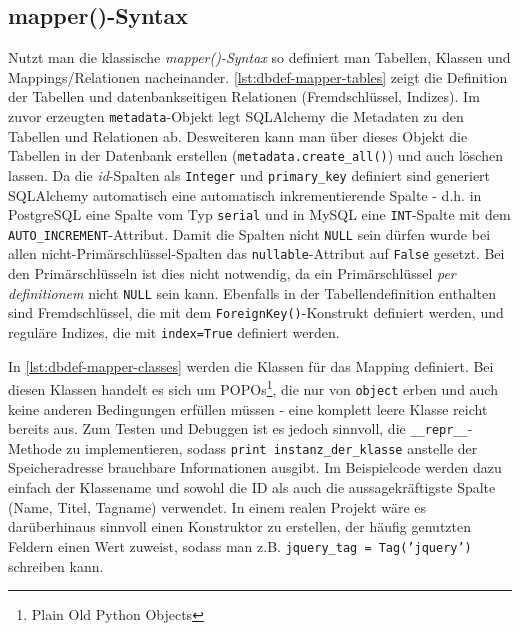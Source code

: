 
\subsection{mapper()-Syntax}

Nutzt man die klassische \emph{mapper()-Syntax} so definiert man Tabellen,
Klassen und Mappings/Relationen nacheinander.
\autoref{lst:dbdef-mapper-tables} zeigt die Definition der Tabellen und
datenbankseitigen Relationen (Fremdschlüssel, Indizes). Im zuvor erzeugten
\texttt{metadata}-Objekt legt SQLAlchemy die Metadaten zu den Tabellen und
Relationen ab. Desweiteren kann man über dieses Objekt die Tabellen in der
Datenbank erstellen (\texttt{metadata.create\_all()}) und auch löschen lassen.
Da die \emph{id}-Spalten als \texttt{Integer} und \texttt{primary\_key}
definiert sind generiert SQLAlchemy automatisch eine automatisch
inkrementierende Spalte - d.h. in PostgreSQL eine Spalte vom Typ \texttt{serial}
und in MySQL eine \texttt{INT}-Spalte mit dem \texttt{AUTO\_INCREMENT}-Attribut.
Damit die Spalten nicht \texttt{NULL} sein dürfen wurde bei allen
nicht-Primärschlüssel-Spalten das \texttt{nullable}-Attribut auf \texttt{False}
gesetzt. Bei den Primärschlüsseln ist dies nicht notwendig, da ein
Primärschlüssel \textit{per definitionem} nicht \texttt{NULL} sein kann.
Ebenfalls in der Tabellendefinition enthalten sind Fremdschlüssel, die mit dem
\texttt{ForeignKey()}-Konstrukt definiert werden, und reguläre Indizes, die mit
\texttt{index=True} definiert werden.



In \autoref{lst:dbdef-mapper-classes} werden die Klassen für das Mapping
definiert. Bei diesen Klassen handelt es sich um POPOs\footnote{Plain Old Python
Objects}, die nur von \texttt{object} erben und auch keine anderen Bedingungen
erfüllen müssen - eine komplett leere Klasse reicht bereits aus. Zum Testen und
Debuggen ist es jedoch sinnvoll, die \texttt{\_\_repr\_\_}-Methode zu
implementieren, sodass \texttt{print instanz\_der\_klasse} anstelle der
Speicheradresse brauchbare Informationen ausgibt. Im Beispielcode werden dazu
einfach der Klassename und sowohl die ID als auch die aussagekräftigste Spalte
(Name, Titel, Tagname) verwendet. In einem realen Projekt wäre es darüberhinaus
sinnvoll einen Konstruktor zu erstellen, der häufig genutzten Feldern einen Wert
zuweist, sodass man z.B. \texttt{jquery\_tag = Tag('jquery')} schreiben kann.

